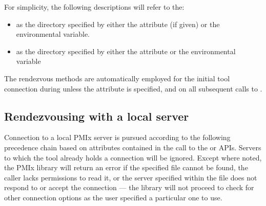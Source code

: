 For simplicity, the following descriptions will refer to the:

\begin{itemize}
    \item {} as the directory specified by either the  attribute (if given) or the  environmental variable.
    \item {} as the directory specified by either the  attribute or the  environmental variable
\end{itemize}

The rendezvous methods are automatically employed for the initial tool connection during  unless the  attribute is specified, and on all subsequent calls to .

\subsection{Rendezvousing with a local server}

Connection to a local \ac{PMIx} server is pursued according to the following precedence chain based on attributes contained in the call to the  or  \acp{API}. Servers to which the tool already holds a connection will be ignored. Except where noted, the \ac{PMIx} library will return an error if the specified file cannot be found, the caller lacks permissions to read it, or the server specified within the file does not respond to or accept the connection — the library will not proceed to check for other connection options as the user specified a particular one to use.

